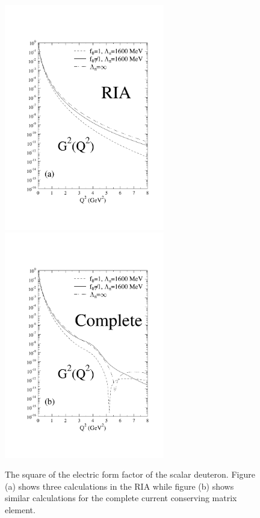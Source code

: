 \documentclass[mythesis.tex]{subfiles}
\begin{document}
\begin{figure}
 \centerline{\includegraphics[width=2.75in]{graphics/g_sq_ria.pdf}
             \includegraphics[width=2.75in]{graphics/g_sq_abc.pdf}}
  \caption{The square of the electric form factor of the scalar deuteron.
Figure (a) shows three calculations in the RIA while figure (b)
shows similar calculations for the complete current conserving
matrix element.}\label{scalarff}
\end{figure}
\end{document}
